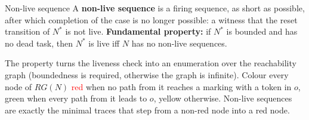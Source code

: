 \begin{definitionbox}{Non-live sequence}
A \textbf{non-live sequence} is a firing sequence, as short as possible, after which completion of the case is no longer possible: a witness that the reset transition of $N^{*}$ is not live. \textbf{Fundamental property:} if $N^{*}$ is bounded and has no dead task, then $N^{*}$ is live iff $N$ has no non-live sequences.
\end{definitionbox}
The property turns the liveness check into an enumeration over the reachability graph (boundedness is required, otherwise the graph is infinite). Colour every node of $\mathit{RG}(N)$ \textcolor{red}{red} when no path from it reaches a marking with a token in $o$, \textcolor{green!50!black}{green} when every path from it leads to $o$, yellow otherwise. Non-live sequences are exactly the minimal traces that step from a non-red node into a red node.
